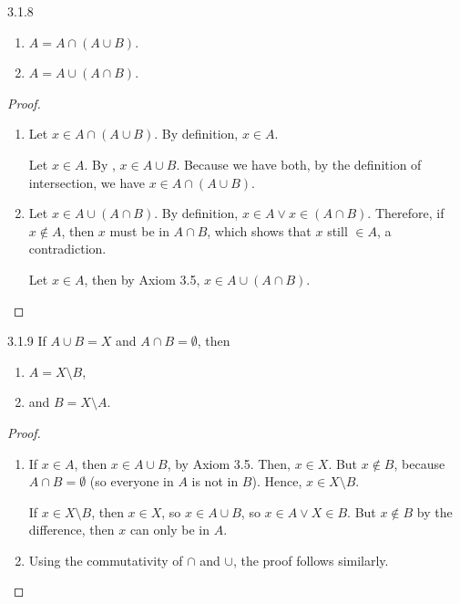 \begin{exercise}{3.1.8}
	\begin{enumerate}
		\item $A = A \cap (A \cup B)$.
		\item $A = A \cup (A \cap B)$.
	\end{enumerate}
\end{exercise}
\begin{proof}\leavevmode
	\begin{enumerate}
		\item Let $x \in A \cap (A \cup B)$. By definition, $x \in A$. 
		
		Let $x \in A$. By , $x \in A \cup B$. Because we have both, by the definition of intersection, we have $x \in A \cap (A \cup B)$.
		
		\item Let $x \in A \cup (A \cap B)$. By definition, $x \in A \vee x \in (A \cap B)$. Therefore, if $x \notin A$, then $x$ must be in $A \cap B$, which shows that $x$ still $\in A$, a contradiction.
		
		Let $x \in A$, then by Axiom 3.5, $x \in A \cup (A \cap B)$. 
	\end{enumerate}
\end{proof}

\begin{exercise}{3.1.9}
	If $A \cup B = X$ and $A \cap B = \emptyset$, then
	\begin{enumerate}
		\item $A = X \setminus B$,
		\item and $B = X \setminus A$.
	\end{enumerate}
\end{exercise}
\begin{proof}\leavevmode
	\begin{enumerate}
		\item If $x \in A$, then $x \in A \cup B$, by Axiom 3.5. Then, $x \in X$. But $x \notin B$, because $A \cap B = \emptyset$ (so everyone in $A$ is not in $B$). Hence, $x \in X \setminus B$.
		
		If $x \in X \setminus B$, then $x \in X$, so $x \in A \cup B$, so $x \in A \vee X \in B$. But $x \notin B$ by the difference, then $x$ can only be in $A$.
		
		\item Using the commutativity of $\cap$ and $\cup$, the proof follows similarly.
	\end{enumerate}
\end{proof}


